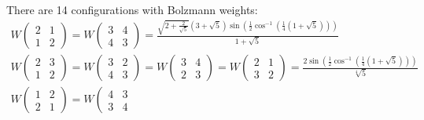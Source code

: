 \documentclass[12pt]{article}
\begin{document}
\begin{itemize}
There are 14 configurations with Bolzmann weights:
\begin{equation}
  \label{eq:12}
  \begin{array}{l}
    W\left(                                          
        \begin{array}{cc}
          2 & 1 \\
          1 & 2
        \end{array}
      \right)=
    W\left(
        \begin{array}{cc}
          3 & 4 \\
          4 & 3
        \end{array}
      \right)=
\frac{\sqrt{2+\frac{2}{\sqrt{5}}}
      \left(3+\sqrt{5}\right) \sin \left(\frac{1}{2} \cos^{-1}\left(\frac{1}{4}
          \left(1+\sqrt{5}\right)\right)\right)}{1+\sqrt{5}}\\
    W\left(                                      
        \begin{array}{cc}
          2 & 3 \\
          1 & 2
        \end{array}
      \right)=
    W\left(                                         
        \begin{array}{cc}
          3 & 2 \\
          4 & 3
        \end{array}
      \right)=    W\left(                                         
        \begin{array}{cc}
          3 & 4 \\
          2 & 3
        \end{array}
      \right)=    W\left(                                         
        \begin{array}{cc}
          2 & 1 \\
          3 & 2
        \end{array}
      \right)=\frac{2 \sin \left(\frac{1}{2} \cos^{-1}\left(\frac{1}{4}
          \left(1+\sqrt{5}\right)\right)\right)}{\sqrt[4]{5}}\\
    W\left(                                         
        \begin{array}{cc}
          1 & 2 \\
          2 & 1
        \end{array}
      \right)= 
      W\left(                                                  
        \begin{array}{cc}
          4 & 3 \\
          3 & 4

\end{array}
\end{array}
\end{equation}
\end{itemize}
\end{document}
